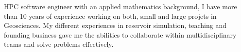 

\begin{cvparagraph}

HPC software engineer with an applied mathematics background, I have more than 10 years of experience working on both, small and large projets in Geosciences.
My different experiences in reservoir simulation, teaching and founding business gave me the abilities to collaborate within multidisciplinary teams and solve problems effectively.
\end{cvparagraph}
